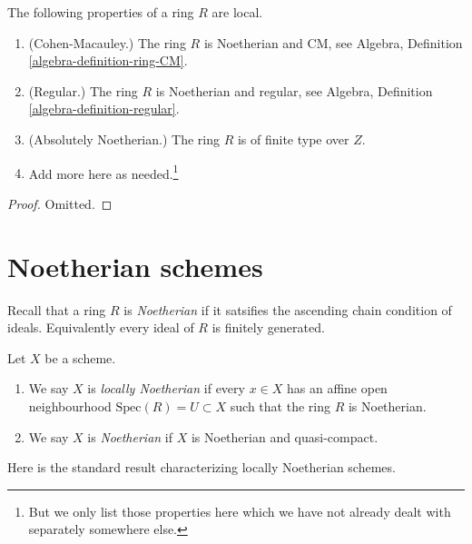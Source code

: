 \begin{lemma}
\label{lemma-properties-local}
The following properties of a ring $R$ are local.
\begin{enumerate}
\item (Cohen-Macauley.)
The ring $R$ is Noetherian and CM, see
Algebra, Definition \ref{algebra-definition-ring-CM}.
\item (Regular.)
The ring $R$ is Noetherian and regular, see
Algebra, Definition \ref{algebra-definition-regular}.
\item (Absolutely Noetherian.)
The ring $R$ is of finite type over $Z$.
\item Add more here as needed.\footnote{But we only list those properties
here which we have not already dealt with separately somewhere else.}
\end{enumerate}
\end{lemma}

\begin{proof}
Omitted.
\end{proof}















\section{Noetherian schemes}
\label{section-noetherian}

\noindent
Recall that a ring $R$ is {\it Noetherian} if it satsifies the ascending
chain condition of ideals. Equivalently every ideal of $R$ is finitely
generated.

\begin{definition}
\label{definition-noetherian}
Let $X$ be a scheme.
\begin{enumerate}
\item We say $X$ is {\it locally Noetherian} if every
$x \in X$ has an affine open neighbourhood
$\text{Spec}(R) = U \subset X$ such that the ring $R$ is Noetherian.
\item We say $X$ is {\it Noetherian} if $X$ is Noetherian
and quasi-compact.
\end{enumerate}
\end{definition}

\noindent
Here is the standard result characterizing locally Noetherian schemes.

